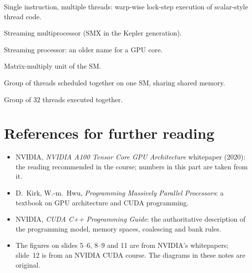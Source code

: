 \begin{description}[leftmargin=2.2cm,labelwidth=2cm,style=nextline,itemsep=2pt]
  \item[SIMT] Single instruction, multiple threads: warp-wise lock-step execution of scalar-style thread code.
  \item[SM / SMX] Streaming multiprocessor (SMX in the Kepler generation).
  \item[SP] Streaming processor: an older name for a GPU core.
  \item[Tensor Core] Matrix-multiply unit of the SM.
  \item[Thread block] Group of threads scheduled together on one SM, sharing shared memory.
  \item[Warp] Group of $32$ threads executed together.
\end{description}

\section{References for further reading}

\begin{itemize}
  \item NVIDIA, \emph{NVIDIA A100 Tensor Core GPU Architecture} whitepaper (2020): the reading recommended in the course; numbers in this part are taken from it.
  \item D.~Kirk, W.-m.~Hwu, \emph{Programming Massively Parallel Processors}: a textbook on GPU architecture and CUDA programming.
  \item NVIDIA, \emph{CUDA C++ Programming Guide}: the authoritative description of the programming model, memory spaces, coalescing and bank rules.
  \item The figures on slides 5--6, 8--9 and 11 are from NVIDIA's whitepapers; slide~12 is from an NVIDIA CUDA course. The diagrams in these notes are original.
\end{itemize}
